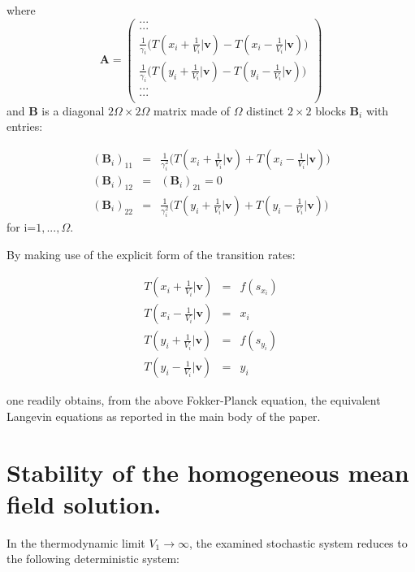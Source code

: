\documentclass[showpacs,prl,superscriptaddress,nofootinbib, twocolumn]{revtex4}
\begin{document}
where
\[
{\boldsymbol A}=
\begin{pmatrix}
... \\
...  \\
\frac{1}{\gamma_i} \big(T({x_i}+\frac{1}{V_i}|{\boldsymbol v})-T({x_i}-\frac{1}{V_i}|{\boldsymbol v})  \big) \\
\frac{1}{\gamma_i}\big(T({y_i}+\frac{1}{V_i}|{\boldsymbol v})-T({y_i}-\frac{1}{V_i}|{\boldsymbol v})  \big) \\
... \\
... \\
\end{pmatrix}
\]
and ${\boldsymbol B}$ is a diagonal $2 \Omega \times 2 \Omega$ matrix made of  $\Omega$ distinct $2 \times 2$ blocks ${\boldsymbol B}_i$ with entries:

\begin{eqnarray*}
({\boldsymbol B}_i)_{11}&=&\frac{1}{\gamma_i^2}\big(T({x_i}+\frac{1}{V_i}|{\boldsymbol v})+T({x_i}-\frac{1}{V_i}|{\boldsymbol v})  \big) \\
({\boldsymbol B}_i)_{12}&=&({\boldsymbol B}_i)_{21}=0 \\
({\boldsymbol B}_i)_{22}&=& \frac{1}{\gamma_i^2}\big(T({y_i}+\frac{1}{V_i}|{\boldsymbol v})+T({y_i}-\frac{1}{V_i}|{\boldsymbol v})  \big) 
\end{eqnarray*}
for i=$1, ..., \Omega$.

By making use of the explicit form of the transition rates:

\begin{eqnarray*}
T({x_i}+\frac{1}{V_i}|{\boldsymbol v}) &=& f(s_{x_i}) \\
T({x_i}-\frac{1}{V_i}|{\boldsymbol v})  &=& x_i \\
T({y_i}+\frac{1}{V_i}|{\boldsymbol v}) &=& f(s_{y_i}) \\
T({y_i}-\frac{1}{V_i}|{\boldsymbol v})  &=& y_i 
\end{eqnarray*}


one readily obtains, from the above Fokker-Planck equation, the equivalent Langevin equations as reported in the main body of the paper. 


\section{Stability of the homogeneous mean field solution.}

In the thermodynamic limit $V_1 \rightarrow \infty$, the examined stochastic system reduces to the following deterministic system: 
\end{document}
